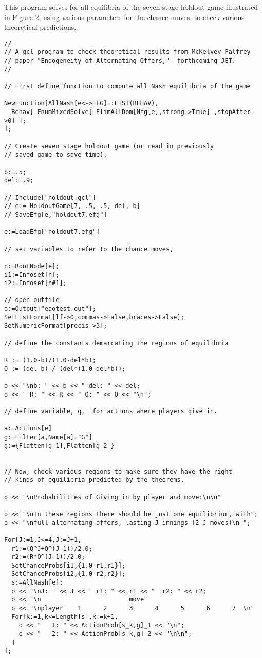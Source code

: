 \noindent
This program solves for all equilibria of the seven stage holdout game
illustrated in Figure 2, using various parameters for the chance
moves, to check various theoretical predictions. 
{\scriptsize
\begin{verbatim}
//
// A gcl program to check theoretical results from McKelvey Palfrey 
// paper "Endogeneity of Alternating Offers,"  forthcoming JET.  
//

// First define function to compute all Nash equilibria of the game

NewFunction[AllNash[e<->EFG]=:LIST(BEHAV),
  Behav[ EnumMixedSolve[ ElimAllDom[Nfg[e],strong->True] ,stopAfter->0] ];
];

// Create seven stage holdout game (or read in previously
// saved game to save time). 

b:=.5;
del:=.9;

// Include["holdout.gcl"]
// e:= HoldoutGame[7, .5, .5, del, b]
// SaveEfg[e,"holdout7.efg"]

e:=LoadEfg["holdout7.efg"]

// set variables to refer to the chance moves, 

n:=RootNode[e];
i1:=Infoset[n];
i2:=Infoset[n#1];

// open outfile 
o:=Output["eaotest.out"];
SetListFormat[lf->0,commas->False,braces->False];
SetNumericFormat[precis->3];

// define the constants demarcating the regions of equilibria

R := (1.0-b)/(1.0-del*b);
Q := (del-b) / (del*(1.0-del*b));

o << "\nb: " << b << " del: " << del;
o << " R: " << R << " Q: " << Q << "\n";

// define variable, g,  for actions where players give in.  

a:=Actions[e]
g:=Filter[a,Name[a]="G"]
g:={Flatten[g_1],Flatten[g_2]}


// Now, check various regions to make sure they have the right 
// kinds of equilibria predicted by the theorems.  

o << "\nProbabilities of Giving in by player and move:\n\n"

o << "\nIn these regions there should be just one equilibrium, with";
o << "\nfull alternating offers, lasting J innings (2 J moves)\n ";

For[J:=1,J<=4,J:=J+1,
  r1:=(Q^J+Q^(J-1))/2.0;
  r2:=(R*Q^(J-1))/2.0;
  SetChanceProbs[i1,{1.0-r1,r1}];
  SetChanceProbs[i2,{1.0-r2,r2}];
  s:=AllNash[e];
  o << "\nJ: " << J << " r1: " << r1 << "  r2: " << r2;
  o << "\n                        move" 
  o << "\nplayer    1      2      3      4      5      6      7  \n" 
  For[k:=1,k<=Length[s],k:=k+1,
    o << "   1: " << ActionProb[s_k,g]_1 << "\n";
    o << "   2: " << ActionProb[s_k,g]_2 << "\n\n";
  ]
];


\end{verbatim}}
